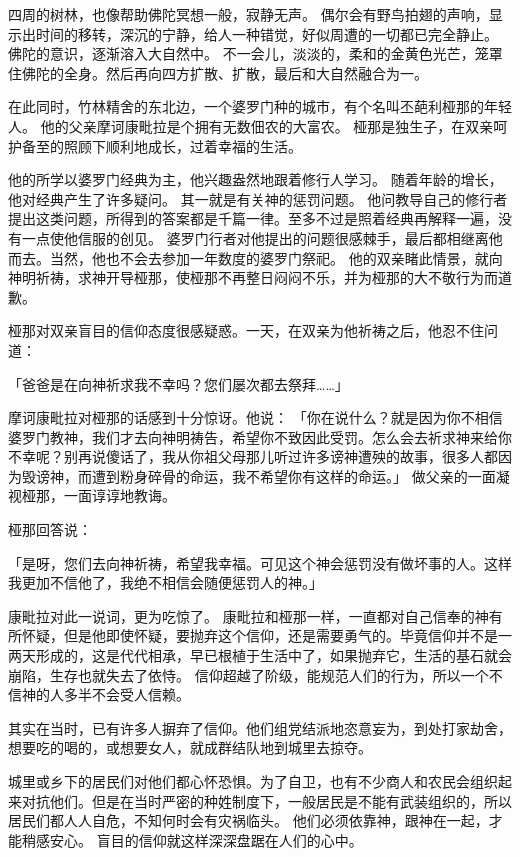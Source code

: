 \documentclass[twoside,openany]{book}
\begin{document}
四周的树林，也像帮助佛陀冥想一般，寂静无声。
偶尔会有野鸟拍翅的声响，显示出时间的移转，深沉的宁静，给人一种错觉，好似周遭的一切都已完全静止。
佛陀的意识，逐渐溶入大自然中。
不一会儿，淡淡的，柔和的金黄色光芒，笼罩住佛陀的全身。然后再向四方扩散、扩散，最后和大自然融合为一。

在此同时，竹林精舍的东北边，一个婆罗门种的城市，有个名叫丕葩利\textperiodcentered 桠那的年轻人。
他的父亲摩诃康毗拉是个拥有无数佃农的大富农。
桠那是独生子，在双亲呵护备至的照顾下顺利地成长，过着幸福的生活。

他的所学以婆罗门经典为主，他兴趣盎然地跟着修行人学习。
随着年龄的增长，他对经典产生了许多疑问。
其一就是有关神的惩罚问题。
他问教导自己的修行者提出这类问题，所得到的答案都是千篇一律。至多不过是照着经典再解释一遍，没有一点使他信服的创见。
婆罗门行者对他提出的问题很感棘手，最后都相继离他而去。当然，他也不会去参加一年数度的婆罗门祭祀。
他的双亲睹此情景，就向神明祈祷，求神开导桠那，使桠那不再整日闷闷不乐，并为桠那的大不敬行为而道歉。

桠那对双亲盲目的信仰态度很感疑惑。一天，在双亲为他祈祷之后，他忍不住问道：

「爸爸是在向神祈求我不幸吗？您们屡次都去祭拜……」

摩诃康毗拉对桠那的话感到十分惊讶。他说：
「你在说什么？就是因为你不相信婆罗门教神，我们才去向神明祷告，希望你不致因此受罚。怎么会去祈求神来给你不幸呢？别再说傻话了，我从你祖父母那儿听过许多谤神遭殃的故事，很多人都因为毁谤神，而遭到粉身碎骨的命运，我不希望你有这样的命运。」
做父亲的一面凝视桠那，一面谆谆地教诲。

桠那回答说：

「是呀，您们去向神祈祷，希望我幸福。可见这个神会惩罚没有做坏事的人。这样我更加不信他了，我绝不相信会随便惩罚人的神。」

康毗拉对此一说词，更为吃惊了。
康毗拉和桠那一样，一直都对自己信奉的神有所怀疑，但是他即使怀疑，要抛弃这个信仰，还是需要勇气的。毕竟信仰并不是一两天形成的，这是代代相承，早已根植于生活中了，如果抛弃它，生活的基石就会崩陷，生存也就失去了依恃。
信仰超越了阶级，能规范人们的行为，所以一个不信神的人多半不会受人信赖。

其实在当时，已有许多人摒弃了信仰。他们组党结派地恣意妄为，到处打家劫舍，想要吃的喝的，或想要女人，就成群结队地到城里去掠夺。

城里或乡下的居民们对他们都心怀恐惧。为了自卫，也有不少商人和农民会组织起来对抗他们。但是在当时严密的种姓制度下，一般居民是不能有武装组织的，所以居民们都人人自危，不知何时会有灾祸临头。
他们必须依靠神，跟神在一起，才能稍感安心。
盲目的信仰就这样深深盘踞在人们的心中。
\end{document}
